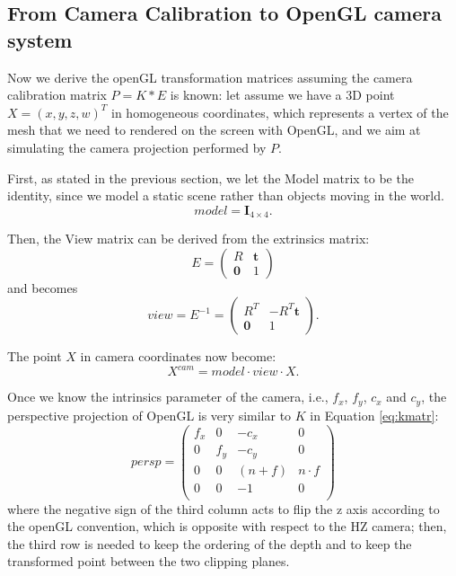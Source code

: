 \subsection{From Camera Calibration to OpenGL camera system}
Now we derive the openGL transformation matrices assuming the camera calibration matrix $P = K * E$ is known: let assume we have a 3D point $X = (x,y,z,w)^T$ in homogeneous coordinates, which represents a vertex of the mesh that we need to rendered on the screen with OpenGL, and we aim at simulating the camera projection performed by $P$.

First, as stated in the previous section, we let the Model matrix to be the identity, since we model a static scene rather than objects moving in the world.
\begin{equation}
  model = \mathbf{I}_{4\times4}.
\end{equation}

Then, the View matrix can be derived from the extrinsics matrix:
\begin{equation}
  E =
\begin{pmatrix}
R & \mathbf{t}\\
\mathbf{0}&1
 \end{pmatrix} 
\end{equation}
and becomes
\begin{equation}
  view = E^{-1}=
\begin{pmatrix}
R^T & -R^T\mathbf{t}\\
\mathbf{0}&1
 \end{pmatrix}.
\end{equation}

The point $X$ in camera coordinates now become:
\begin{equation}
 X^{cam} = model \cdot view \cdot X.
\end{equation}



Once we know the intrinsics parameter of the camera, i.e.,  $f_x$, $f_y$, $c_x$ and $c_y$, the perspective projection of OpenGL is very similar to $K$ in Equation \eqref{eq:kmatr}:
\begin{equation}
 persp =
 \begin{pmatrix}
  f_x & 0   & -c_x    & 0\\
  0   & f_y & -c_y    & 0\\
  0   & 0   & (n+f) & n\cdot f\\
  0   & 0   & -1      & 0\\
 \end{pmatrix}
\end{equation}
where the negative sign of the third column acts to flip the z axis according to the openGL convention, which is opposite with respect to the HZ camera; then, the third row is needed to keep the ordering of the depth and to keep the transformed point between the two clipping planes.

